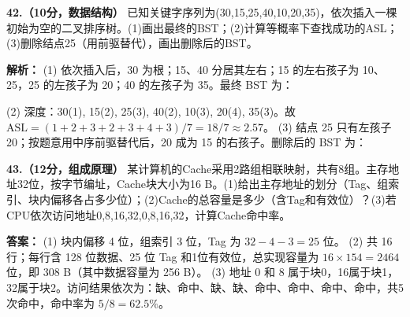 \vspace{8pt}

\noindent\textbf{42.（10分，数据结构）} 已知关键字序列为(30,15,25,40,10,20,35)，依次插入一棵初始为空的二叉排序树。(1)画出最终的BST；(2)计算等概率下查找成功的ASL；(3)删除结点25（用前驱替代），画出删除后的BST。

\ifshowsolutions\par\noindent\textbf{解析：} (1) 依次插入后，30 为根；15、40 分居其左右；15 的左右孩子为 10、25，25 的左孩子为 20；40 的左孩子为 35。最终 BST 为：
\begin{center}
\end{center}
(2) 深度：30(1), 15(2), 25(3), 40(2), 10(3), 20(4), 35(3)。故
$\mathrm{ASL}=(1+2+3+2+3+4+3)/7=18/7\approx2.57$。
(3) 结点 25 只有左孩子 20；按题意用中序前驱替代后，20 成为 15 的右孩子。删除后的 BST 为：
\begin{center}
\end{center}\else \answerarea[8] \fi

\vspace{8pt}

\noindent\textbf{43.（12分，组成原理）} 某计算机的Cache采用2路组相联映射，共有8组。主存地址32位，按字节编址，Cache块大小为16 B。(1)给出主存地址的划分（Tag、组索引、块内偏移各占多少位）；(2)Cache的总容量是多少（含Tag和有效位）？(3)若CPU依次访问地址0,8,16,32,0,8,16,32，计算Cache命中率。

\ifshowsolutions\par\noindent\textbf{答案：} (1) 块内偏移 4 位，组索引 3 位，Tag 为 $32-4-3=25$ 位。
(2) 共 16 行；每行含 128 位数据、25 位 Tag 和1位有效位，总实现容量为 $16\times154=2464$ 位，即 308 B（其中数据容量为 256 B）。
(3) 地址 0 和 8 属于块0，16属于块1，32属于块2。访问结果依次为：缺、命中、缺、缺、命中、命中、命中、命中，共5次命中，命中率为 $5/8=62.5\%$。\else \answerarea[8] \fi

